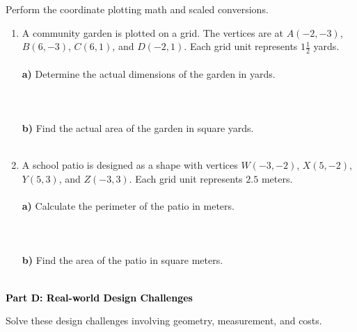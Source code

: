 \documentclass[12pt, letterpaper, fleqn]{article}
\newcommand{\blanklong}{\underline{\hspace{6.5cm}}}
\begin{document}
\vspace{3mm}

\noindent
Perform the coordinate plotting math and scaled conversions.

\vspace{5mm}

\begin{enumerate}[itemsep=3cm, leftmargin=0.6cm]
\item A community garden is plotted on a grid. The vertices are at $A(-2, -3)$, $B(6, -3)$, $C(6, 1)$, and $D(-2, 1)$. Each grid unit represents $1\frac{1}{2}$ yards. \\ \\
\textbf{a)} Determine the actual dimensions of the garden in yards. \\ \\
\blanklong \\ \\
\textbf{b)} Find the actual area of the garden in square yards. \\ \\
\blanklong

\item A school patio is designed as a shape with vertices $W(-3, -2)$, $X(5, -2)$, $Y(5, 3)$, and $Z(-3, 3)$. Each grid unit represents $2.5$ meters. \\ \\
\textbf{a)} Calculate the perimeter of the patio in meters. \\ \\
\blanklong \\ \\
\textbf{b)} Find the area of the patio in square meters. \\ \\
\blanklong 
\end{enumerate}

\newpage

\begin{tcolorbox}[colback=black!10]
    \large\textcolor{black}{\textbf{Part D: Real-world Design Challenges}}
\end{tcolorbox}

\vspace{3mm}

\noindent
Solve these design challenges involving geometry, measurement, and costs.

\vspace{5mm}
\end{document}
